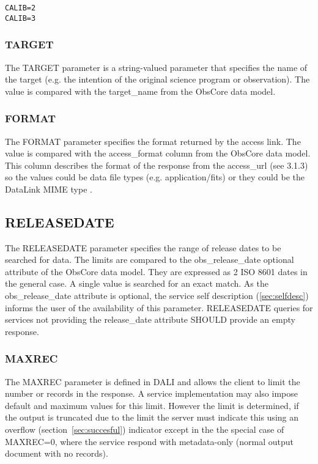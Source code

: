 \documentclass[11pt,a4paper]{ivoa}
\begin{document}
\begin{lstlisting}
CALIB=2
CALIB=3
\end{lstlisting}

\subsubsection{TARGET}
The TARGET parameter is a string-valued parameter that specifies the name of the target (e.g. the intention of the original science program or observation).
The value is compared with the target\_name from the ObsCore data model.

\subsubsection{FORMAT}
The FORMAT parameter specifies the format returned by the access link. The value is compared with the access\_format column from the ObsCore data model.
This column describes the format of the response from the access\_url (see 3.1.3) so the values could be data file types (e.g. application/fits) or they
could be the DataLink MIME type \citep{2023ivoa.spec.1215B}.

\subsection{RELEASEDATE}
The RELEASEDATE parameter specifies the range of release dates to be searched for data.
The limits are compared to the obs\_release\_date optional attribute of the ObsCore data model.
They are expressed as 2 ISO 8601 dates in the general case. A single value is searched for an exact match.
As the obs\_release\_date attribute is optional, the service self description (\ref{sec:selfdesc})  informs the user of the availability of this parameter.
RELEASEDATE queries for services not providing the release\_date attribute SHOULD provide an empty response.

\subsubsection{MAXREC}
The MAXREC parameter is defined in DALI and allows the client to limit the number or records in the response. A service implementation may also impose default and maximum values for this limit. However the limit is determined, if the output is truncated due to the limit the server must indicate this using an overflow  (section~\ref{sec:succesful}) indicator except in the the special case of MAXREC=0, where the  service respond with metadata-only (normal output document with no records).
\end{document}
